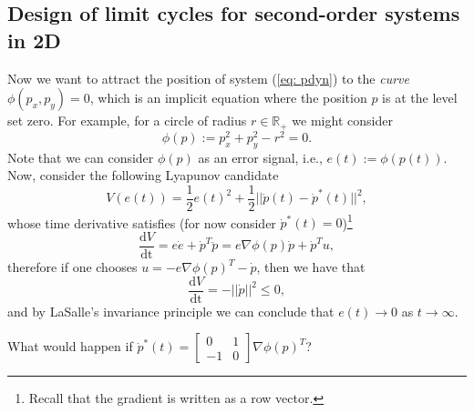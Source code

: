 \documentclass[11pt,a4paper,titlepage]{article}
\begin{document}
	\subsection{Design of limit cycles for second-order systems in 2D}
	Now we want to attract the position of system (\ref{eq: pdyn}) to the \emph{curve} $\phi(p_x, p_y) = 0$, which is an implicit equation where the position $p$ is at the level set zero. For example, for a circle of radius $r\in\mathbb{R}_+$ we might consider
	\begin{equation}
	\phi(p) := p_x^2 + p_y^2 - r^2 = 0.
	\end{equation}
	Note that we can consider $\phi(p)$ as an error signal, i.e., $e(t) := \phi(p(t))$. Now, consider the following Lyapunov candidate
\begin{equation}
	V(e(t)) = \frac{1}{2}e(t)^2 + \frac{1}{2}||\dot p(t) - \dot p^*(t)||^2,
	\label{eq: Ve2}
\end{equation}
	whose time derivative satisfies (for now consider $\dot p^*(t) = 0$)\footnote{Recall that the gradient is written as a row vector.}
	\begin{equation}
		\frac{\mathrm{d}V}{\mathrm{dt}} = e\dot e + \dot p^T\ddot p = e \nabla\phi(p) \dot p + \dot p^T u,
	\end{equation}
	therefore if one chooses $u = -e \nabla\phi(p)^T -\dot p$, then we have that
	\begin{equation}
\frac{\mathrm{d}V}{\mathrm{dt}} = -||\dot p||^2 \leq 0,
	\end{equation}
and by LaSalle's invariance principle we can conclude that $e(t) \to 0$ as $t\to\infty$.

What would happen if $\dot p^*(t) = \begin{bmatrix}0 & 1 \\ -1 & 0\end{bmatrix}\nabla\phi(p)^T$?
\end{document}
